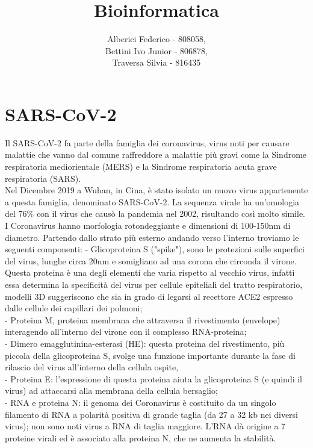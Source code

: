 \documentclass[a4paper,10pt]{article}
\title{Bioinformatica}
\author{Alberici Federico - 808058, \\ Bettini Ivo Junior - 806878, \\ Traversa Silvia - 816435}
\date{}
\begin{document}
\maketitle 

\section*{SARS-CoV-2}
Il SARS-CoV-2 fa parte della famiglia dei coronavirus, virus noti per causare malattie che vanno dal comune raffreddore a malattie più gravi come la Sindrome respiratoria mediorientale (MERS) e la Sindrome respiratoria acuta grave respiratoria (SARS). \\
Nel Dicembre 2019 a Wuhan, in Cina, è stato isolato un nuovo virus appartenente a questa famiglia, denominato SARS-CoV-2. La sequenza virale ha un'omologia del 76\% con il virus che causò la pandemia nel 2002, risultando così molto simile.\\
I Coronavirus hanno morfologia rotondeggiante e dimensioni di 100-150nm di diametro. Partendo dallo strato più esterno andando verso l'interno troviamo le seguenti componenti:
	- Glicoproteina S ("spike"), sono le protezioni sulle superfici del virus, lunghe circa 20nm e somigliano ad una corona che circonda il virone. Questa proteina è una degli elementi che varia rispetto al vecchio virus, infatti  essa determina la specificità del virus per cellule epiteliali del tratto respiratorio, modelli 3D suggeriscono che sia in grado di legarsi al recettore ACE2 espresso dalle cellule dei capillari dei polmoni; 	\\
	- Proteina M, proteina membrana che attraversa il rivestimento (envelope) interagendo all'interno del virone con il complesso RNA-proteina;\\
	- Dimero emagglutinina-esterasi (HE): questa proteina del rivestimento, più piccola della glicoproteina S, svolge una funzione importante durante la fase di rilascio del virus all’interno della cellula ospite, \\
	- Proteina E: l’espressione di questa proteina aiuta la glicoproteina S (e quindi il virus) ad attaccarsi alla membrana della cellula bersaglio;\\
	- RNA e proteina N: il genoma dei Coronavirus è costituito da un singolo filamento di RNA a polarità positiva di grande taglia (da 27 a 32 kb nei diversi virus); non sono noti virus a RNA di taglia maggiore. L’RNA dà origine a 7 proteine virali ed è associato alla proteina N, che ne aumenta la stabilità.\\
\end{document}
